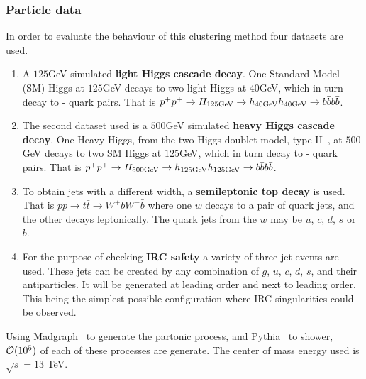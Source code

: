\subsubsection{Particle data}

    In order to evaluate the behaviour of this clustering method four datasets are used.

    \begin{enumerate}
        \item A \(125\)GeV simulated \textbf{light Higgs cascade decay}.
    One Standard Model (SM) Higgs at \(125\)GeV decays to two light Higgs at \(40\)GeV,
    which in turn decay to \beau{}-\bbar{} quark pairs.
    That is \(p^+ p^+ \rightarrow H_{125\text{GeV}} \rightarrow h_{40\text{GeV}} h_{40\text{GeV}} \rightarrow b \bar{b} b \bar{b}\).

\item The second dataset used is a \(500\)GeV simulated \textbf{heavy Higgs cascade decay}.
         One Heavy Higgs, from the two Higgs doublet model, type-II~\cite{2hdm_modelfile}, at \(500\)GeV decays to two SM Higgs at \(125\)GeV,
    which in turn decay to \beau{}-\bbar{} quark pairs.
    That is \(p^+ p^+ \rightarrow H_{500\text{GeV}} \rightarrow h_{125\text{GeV}} h_{125\text{GeV}} \rightarrow b \bar{b} b \bar{b}\).

\item To obtain jets with a different width, a \textbf{semileptonic top decay} is used.
        That is \( p p \rightarrow t \bar{t} \rightarrow W^+ b W^- \bar{b} \)  where one \(w\) decays to a pair of quark jets, and the other decays leptonically.
        The quark jets from the \(w\) may be \(u\), \(c\), \(d\), \(s\) or \(b\).
        

    \item For the purpose of checking \textbf{IRC safety} a variety of three jet events are used.
        These jets can be created by any combination of \(g\), \(u\), \(c\), \(d\), \(s\), and their antiparticles.
        It will be generated at leading order and next to leading order.
        This being the simplest possible configuration where IRC singularities could be observed.

    \end{enumerate}

    Using Madgraph~\cite{alwall_madgraph2011} to generate the partonic process, and Pythia~\cite{sjostrand_pythia2015} to shower, ${\cal O}(10^5)$ of each of these processes are generate.
    The center of mass energy used is \(\sqrt{s}=13 \) TeV.


